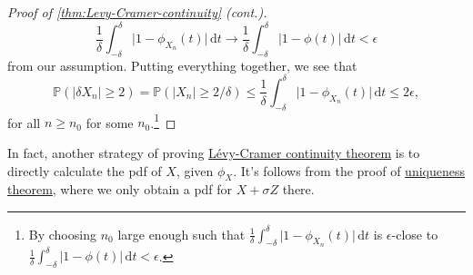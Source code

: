 \begin{proof}[Proof of \autoref{thm:Levy-Cramer-continuity} (cont.)]
	\[
		\frac{1}{\delta } \int_{-\delta }^{\delta } \vert 1 - \phi _{X_n}(t) \vert  \,\mathrm{d}t
		\to \frac{1}{\delta } \int_{-\delta }^{\delta } \vert 1 - \phi (t) \vert  \,\mathrm{d}t
		< \epsilon
	\]
	from our assumption. Putting everything together, we see that
	\[
		\mathbb{P} (\vert \delta X_n \vert \geq 2)
		= \mathbb{P} (\vert X_n \vert \geq 2 / \delta )
		\leq \frac{1}{\delta } \int_{-\delta }^{\delta } \vert 1 - \phi _{X_n}(t) \vert  \,\mathrm{d}t
		\leq 2 \epsilon ,
	\]
	for all \(n \geq n_0\) for some \(n_0\).\footnote{By choosing \(n_0\) large enough such that \(\frac{1}{\delta } \int_{-\delta }^{\delta } \vert 1 - \phi _{X_n}(t) \vert  \,\mathrm{d}t\) is \(\epsilon \)-close to \(\frac{1}{\delta } \int_{-\delta }^{\delta } \vert 1 - \phi (t) \vert  \,\mathrm{d}t < \epsilon \).}
\end{proof}

In fact, another strategy of proving \hyperref[thm:Levy-Cramer-continuity]{Lévy-Cramer continuity theorem} is to directly calculate the pdf of \(X\), given \(\phi _X\). It's follows from the proof of \hyperref[thm:characteristic-function-uniqueness]{uniqueness theorem}, where we only obtain a pdf for \(X + \sigma Z\) there.

